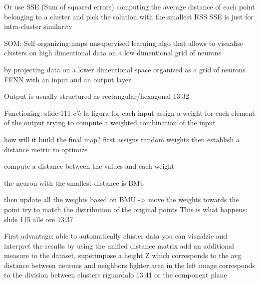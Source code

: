                         Or use SSE (Sum of squared errors) computing the average distance of each point belonging to a cluster 
                        and pick the solution with the smallest RSS 
                        SSE is just for intra-cluster similarity 
                
                SOM: Self organizing maps 
                    unsupervised learning algo that allows to visualise clusters on high dimentional data on a low dimentional grid of neurons 

                    by projecting data on a lower dimentional space organized as a grid of neurons 
                    FFNN with an input and an output layer 

                    Output is usually structured as rectangular/hexagonal 13:32

                    Functioning: slide 111 c'è la figura 
                        for each input assign a weight for each element of the output
                        trying to compute a weighted combination of the input 

                        how will it build the final map?
                            first assigns random weights 
                            then establish a distance metric to optimize

                            compute a distance between the values and each weight 

                            the neuron with the smallest distance is BMU 

                            then update all the weights based on BMU -> move the weights towards the point 
                            try to match the distribution of the original points 
                            This is what happens: slide 115 alle ore 13:37 

                            First advantage:
                                able to automatically cluster data 
                                you can visualzie and interpret the results 
                                    by using the unified distance matrix
                                        add an additional measure to the dataset, superimpose a height Z which corresponds to the avg distance between neurons and neighbors 
                                        lighter area in the left image corresponds to the division between clusters 
                                        riguardalo 13:41
                                    or the component plane 
\fi

                    


